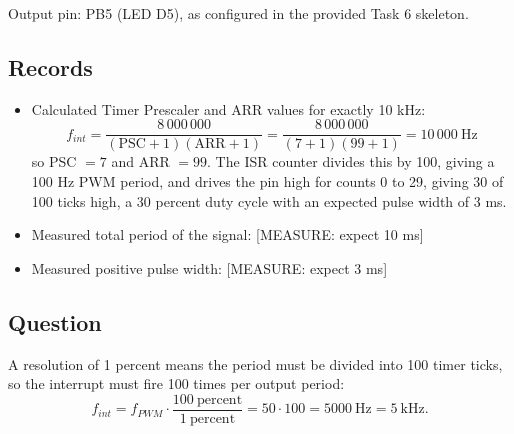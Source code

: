 \documentclass[11pt]{article}
\begin{document}
Output pin: PB5 (LED D5), as configured in the provided Task 6 skeleton.

\subsection{Records}
\begin{itemize}
    \item Calculated Timer Prescaler and ARR values for exactly 10 kHz:
    \[
        f_{int} = \frac{8\,000\,000}{(\text{PSC}+1)(\text{ARR}+1)} = \frac{8\,000\,000}{(7+1)(99+1)} = 10\,000~\text{Hz}
    \]
    so PSC $= 7$ and ARR $= 99$. The ISR counter divides this by 100, giving a 100 Hz PWM period, and drives the pin high for counts 0 to 29, giving 30 of 100 ticks high, a 30 percent duty cycle with an expected pulse width of 3 ms.
    \item Measured total period of the signal: [MEASURE: expect 10 ms]
    \item Measured positive pulse width: [MEASURE: expect 3 ms]
\end{itemize}

\subsection{Question}
A resolution of 1 percent means the period must be divided into 100 timer ticks, so the interrupt must fire 100 times per output period:
\[
    f_{int} = f_{PWM} \cdot \frac{100~\text{percent}}{1~\text{percent}} = 50 \cdot 100 = 5000~\text{Hz} = 5~\text{kHz}.
\]
\end{document}
